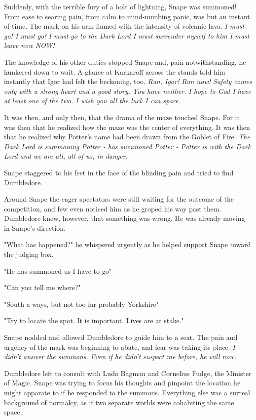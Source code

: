 Suddenly, with the terrible fury of a bolt of lightning, Snape was summoned! From ease to searing pain, from calm to mind-numbing panic, was but an instant of time. The mark on his arm flamed with the intensity of volcanic lava. \emph{I must go! I must go! I must go to the Dark Lord{\el} I must surrender myself to him{\el} I must leave{\el} now{\el} NOW!}

The knowledge of his other duties stopped Snape and, pain notwithstanding, he hunkered down to wait. A glance at Karkaroff across the stands told him instantly that Igor had felt the beckoning, too. \emph{Run, Igor! Run now! Safety comes only with a strong heart and a good story. You have neither. I hope to God I have at least one of the two. I wish you all the luck I can spare.}

It was then, and only then, that the drama of the maze touched Snape. For it was then that he realized how the maze was the center of everything. It was then that he realized why Potter's name had been drawn from the Goblet of Fire. \emph{The Dark Lord is summoning Potter - has summoned Potter - Potter is with the Dark Lord and we are all, all of us, in danger.}

Snape staggered to his feet in the face of the blinding pain and tried to find Dumbledore.

Around Snape the eager spectators were still waiting for the outcome of the competition, and few even noticed him as he groped his way past them. Dumbledore knew, however, that something was wrong. He was already moving in Snape's direction.

"What has happened?" he whispered urgently as he helped support Snape toward the judging box.

"He has{\el} summoned{\el} us{\el} I{\el} have to{\el} go{\el}"

"Can you tell me where?"

"South{\el} a ways, but{\el} not too far{\el} probably{\el} Yorkshire{\el}"

"Try to locate the spot. It is important. Lives are at stake."

Snape nodded and allowed Dumbledore to guide him to a seat. The pain and urgency of the mark was beginning to abate, and fear was taking its place. \emph{I didn't answer the summons. Even if he didn't suspect me before, he will now.}

Dumbledore left to consult with Ludo Bagman and Cornelius Fudge, the Minister of Magic. Snape was trying to focus his thoughts and pinpoint the location he might apparate to if he responded to the summons. Everything else was a surreal background of normalcy, as if two separate worlds were cohabiting the same space.


